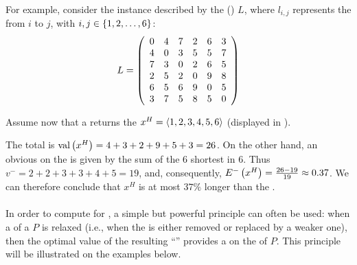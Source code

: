 \paragraph{}
\begin{example}
For example, consider the  instance described by the ()  $L$, where $l_{i,j}$ represents the  from $i$ to $j$, with $i,j\in\accl{1,2,\ldots,6}$:
\begin{equation}
L=\mtrx{cccccc}{
0&4&7&2&6&3\\
4&0&3&5&5&7\\
7&3&0&2&6&5\\
2&5&2&0&9&8\\
6&5&6&9&0&5\\
3&7&5&8&5&0
}
\end{equation}


Assume now that a  returns the  $x^H=\tupl{1,2,3,4,5,6}$ (displayed in ).


The total  is $\funm{val}{x^H}=4+3+2+9+5+3=26$. On the other hand, an obvious  on the  is given by the sum of the $6$ shortest  in $6$. Thus $v^−=2+2+3+3+4+5=19$, and, consequently, $\fun{E^-}{x^H}=\tfrac{26-19}{19}\approx 0.37$. We can therefore conclude that $x^H$ is at most $37\%$ longer than the .
\end{example}

\paragraph{}
In order to compute  for , a simple but powerful principle can often be used: when a  of a  $P$ is relaxed (i.e., when the  is either removed or replaced by a weaker one), then the optimal value of the resulting ``'' provides a  on the  of $P$. This principle will be illustrated on the examples below.
